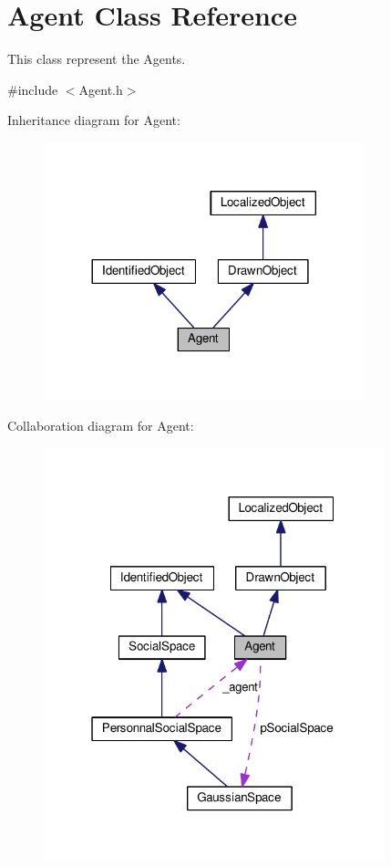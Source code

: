 \hypertarget{classAgent}{}\section{Agent Class Reference}
\label{classAgent}


This class represent the Agents.  




{\ttfamily \#include $<$Agent.\+h$>$}



Inheritance diagram for Agent\+:\nopagebreak
\begin{figure}[H]
\begin{center}
\leavevmode
\includegraphics[width=264pt]{classAgent__inherit__graph}
\end{center}
\end{figure}


Collaboration diagram for Agent\+:\nopagebreak
\begin{figure}[H]
\begin{center}
\leavevmode
\includegraphics[width=280pt]{classAgent__coll__graph}
\end{center}
\end{figure}
